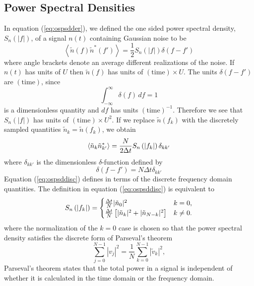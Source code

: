 \subsection{Power Spectral Densities}
\label{ss:psdconv}

In equation (\ref{eq:ospsdder}), we defined the one sided power spectral
density, $S_n(|f|)$, of a signal $n(t)$ containing Gaussian noise to be 
\begin{equation}
\left\langle\tilde{n}(f) \tilde{n}^\ast(f')\right\rangle = 
\frac{1}{2}S_n(|f|)\delta(f-f')
\end{equation}
where angle brackets denote an average different realizations of the noise.
If $n(t)$ has units of $U$ then $\tilde{n}(f)$ has units of
$(\mathrm{time}) \times U$. The units $\delta(f-f')$ are $(\mathrm{time})$,
since 
\begin{equation}
\int_{-\infty}^\infty \delta(f)\,df = 1
\end{equation}
is a dimensionless quantity and $df$ has units $(\mathrm{time})^{-1}$.
Therefore we see that $S_n(|f|)$ has units of $(\mathrm{time})\times U^2$.
If we replace $\tilde{n}(f_k)$ with the discretely sampled quantities 
$\tilde{n}_k = \tilde{n}(f_k)$, we obtain
\begin{equation}
\left\langle\tilde{n}_k \tilde{n}_{k'}^\ast\right\rangle = 
\frac{N}{2\Delta t}S_n\left(\left|f_{k}\right|\right)\delta_{kk'}
\label{eq:ospsddisc}
\end{equation}
where $\delta_{kk'}$ is the dimensionless $\delta$-function defined by
\begin{equation}
\delta(f-f') = N\Delta t\delta_{kk'}
\end{equation}
Equation (\ref{eq:ospsddisc}) defines \ospsd in terms of the discrete
frequency domain quantities.  The definition in equation (\ref{eq:ospsddisc}) is
equivalent to
\begin{equation}
S_n\left(\left|f_{k}\right|\right) =
\begin{cases}
\frac{\Delta t}{N} | \tilde{n}_0 |^2 & k = 0, \\
\frac{\Delta t}{N} \left[ | \tilde{n}_k |^2 + | \tilde{n}_{N-k} |^2 \right] &
k\neq 0.
\end{cases}
\end{equation}
where the normalization of the $k=0$ case is chosen so that the power spectral
density satisfies the discrete form of Parseval's theorem
\begin{equation}
\sum_{j=0}^{N-1} |v_j|^2 = \frac{1}{N} \sum_{k=0}^{N-1} |\tilde{v}_k|^2,
\end{equation}
Parseval's theorem states that the total power in a signal is independent of
whether it is calculated in the time domain or the frequency domain.


